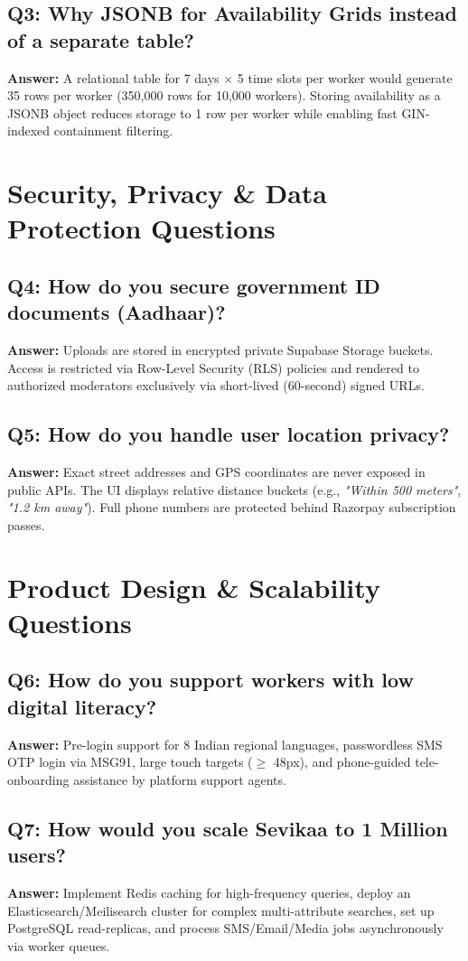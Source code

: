 \documentclass[11pt,a4paper]{article}
\begin{document}
\subsection{Q3: Why JSONB for Availability Grids instead of a separate table?}
\textbf{Answer:}
A relational table for 7 days $\times$ 5 time slots per worker would generate 35 rows per worker (350,000 rows for 10,000 workers). Storing availability as a JSONB object reduces storage to 1 row per worker while enabling fast GIN-indexed containment filtering.

\section{Security, Privacy \& Data Protection Questions}

\subsection{Q4: How do you secure government ID documents (Aadhaar)?}
\textbf{Answer:}
Uploads are stored in encrypted private Supabase Storage buckets. Access is restricted via Row-Level Security (RLS) policies and rendered to authorized moderators exclusively via short-lived (60-second) signed URLs.

\subsection{Q5: How do you handle user location privacy?}
\textbf{Answer:}
Exact street addresses and GPS coordinates are never exposed in public APIs. The UI displays relative distance buckets (e.g., \textit{"Within 500 meters"}, \textit{"1.2 km away"}). Full phone numbers are protected behind Razorpay subscription passes.

\section{Product Design \& Scalability Questions}

\subsection{Q6: How do you support workers with low digital literacy?}
\textbf{Answer:}
Pre-login support for 8 Indian regional languages, passwordless SMS OTP login via MSG91, large touch targets ($\ge$ 48px), and phone-guided tele-onboarding assistance by platform support agents.

\subsection{Q7: How would you scale Sevikaa to 1 Million users?}
\textbf{Answer:}
Implement Redis caching for high-frequency queries, deploy an Elasticsearch/Meilisearch cluster for complex multi-attribute searches, set up PostgreSQL read-replicas, and process SMS/Email/Media jobs asynchronously via worker queues.
\end{document}

